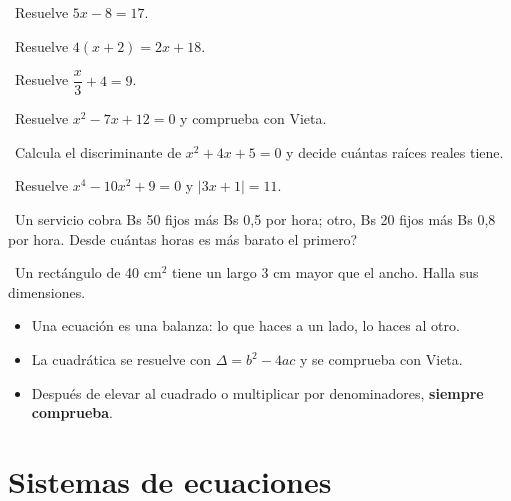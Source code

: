 \begin{tmejercicios}
\label{ej:3-1}
\begin{tmlista}
\item \tmbasico\ Resuelve $5x-8=17$.
\item \tmbasico\ Resuelve $4(x+2)=2x+18$.
\item \tmbasico\ Resuelve $\dfrac{x}{3}+4=9$.
\item \tmmedio\ Resuelve $x^2-7x+12=0$ y comprueba con Vieta.
\item \tmmedio\ Calcula el discriminante de $x^2+4x+5=0$ y decide cu\'antas ra\'ices reales tiene.
\item \tmmedio\ Resuelve $x^4-10x^2+9=0$ y $|3x+1|=11$.
\item \tmdificil\ Un servicio cobra Bs 50 fijos m\'as Bs 0,5 por hora; otro, Bs 20 fijos m\'as Bs 0,8 por hora. \textquestiondown Desde cu\'antas horas es m\'as barato el primero?
\item \tmdificil\ Un rect\'angulo de 40 cm$^2$ tiene un largo 3 cm mayor que el ancho. Halla sus dimensiones.
\end{tmlista}
\end{tmejercicios}


\begin{tmresumen}
\begin{itemize}
\item Una ecuaci\'on es una balanza: lo que haces a un lado, lo haces al otro.
\item La cuadr\'atica se resuelve con $\Delta=b^2-4ac$ y se comprueba con Vieta.
\item Despu\'es de elevar al cuadrado o multiplicar por denominadores, \textbf{siempre comprueba}.
\end{itemize}
\end{tmresumen}

\section{Sistemas de ecuaciones}
\label{sec:3-2}

